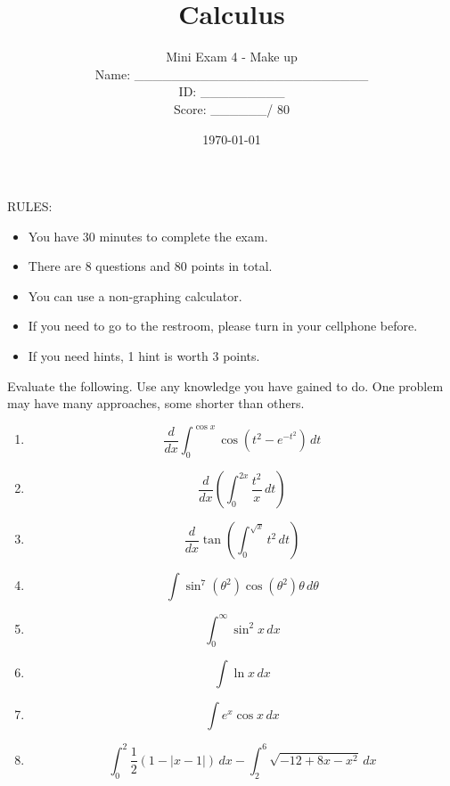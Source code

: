 \documentclass[12pt]{amsart}
\title{ Calculus }
\author{  Mini Exam 4 - Make up  \\ \vspace{1cm} Name: \_\_\_\_\_\_\_\_\_\_\_\_\_\_\_\_\_\_\_\_\_\_\_\_\_  
\\ \vspace{1cm} ID: \_\_\_\_\_\_\_\_\_ \\ \vspace{1cm} Score: \_\_\_\_\_\_/ 80}
\date{\today}
\begin{document}
\maketitle


RULES:
\begin{itemize}
	\item You have 30 minutes to complete the exam.
	\item There are 8 questions and 80 points in total.
	\item You can use a non-graphing calculator.
	\item If you need to go to the restroom, please turn in your cellphone before.
	\item If you need hints, 1 hint is worth 3 points.
\end{itemize}

\newpage


Evaluate the following. Use any knowledge you have gained to do. One problem may have many approaches, some shorter than others.
\begin{enumerate}
	\item $$\frac{d}{dx} \int_0^{\cos x} \cos\left( t^2 - e^{-t^2} \right) \, dt$$
	      \vspace{7cm}
	\item $$ \frac{d}{dx} \left( \int_0^{2x} \frac{t^2}{x} \, dt  \right) $$
	      \newpage
	\item $$ \frac{d}{dx}  \tan \left( \int_0^{\sqrt{x}} t^2 \, dt  \right)  $$
	      \vspace{8cm}
	\item $$\int \sin^7 (\theta^2) \cos (\theta^2) \theta \, d\theta$$
	      \newpage
	\item $$ \int_0^\infty \sin^2 x \, dx $$
	      \vspace{8cm}
	\item $$ \int \ln x \, dx $$
	      \newpage
	\item $$ \int e^x \cos x \, dx $$
	      \vspace{8cm}
	\item $$ \int_0^{2} \frac{1}{2} \left( 1 - \left| x - 1   \right|  \right)  \, dx - \int_2^6 \sqrt{-12 + 8x -x^2}   \, dx $$
	      \vspace{7cm}
\end{enumerate}
\end{document}
